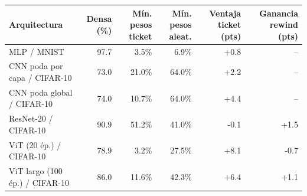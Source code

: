 \begin{tabular}{@{}lrrrrr@{}}\toprule
Arquitectura & Densa (\%) & M\'in. pesos ticket & M\'in. pesos aleat. & Ventaja ticket (pts) & Ganancia rewind (pts) \\\midrule
MLP / MNIST & 97.7 & 3.5\% & 6.9\% & +0.8 & -- \\
CNN poda por capa / CIFAR-10 & 73.0 & 21.0\% & 64.0\% & +2.2 & -- \\
CNN poda global / CIFAR-10 & 74.0 & 10.7\% & 64.0\% & +4.4 & -- \\
ResNet-20 / CIFAR-10 & 90.9 & 51.2\% & 41.0\% & -0.1 & +1.5 \\
ViT (20 ép.) / CIFAR-10 & 78.9 & 3.2\% & 27.5\% & +8.1 & -0.7 \\
ViT largo (100 ép.) / CIFAR-10 & 86.0 & 11.6\% & 42.3\% & +6.4 & +1.1 \\
\bottomrule\end{tabular}
